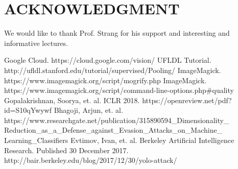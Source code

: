 
\section*{ACKNOWLEDGMENT}

We would like to thank Prof. Strang for his support and interesting and informative lectures.

\begin{thebibliography}{99}

  Google Cloud. https://cloud.google.com/vision/
  UFLDL Tutorial. http://ufldl.stanford.edu/tutorial/supervised/Pooling/
  ImageMagick. https://www.imagemagick.org/script/mogrify.php
  ImageMagick. https://www.imagemagick.org/script/command-line-options.php\#quality
 Gopalakrishnan, Soorya, et. al.  ICLR 2018. https://openreview.net/pdf?id=S10qYwywf
 Bhagoji, Arjun, et. al.  https://www.researchgate.net/publication/315890594\_Dimensionality\_ Reduction\_as\_a\_Defense\_against\_Evasion\_Attacks\_on\_Machine\_ Learning\_Classifiers
 Evtimov, Ivan, et. al.  Berkeley Artificial Intelligence Research. Published 30 December 2017. http://bair.berkeley.edu/blog/2017/12/30/yolo-attack/

\end{thebibliography}


